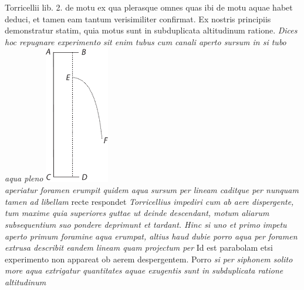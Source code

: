 Torricellii\protect{} lib. 2. de motu  ex qua plerasque omnes quas ibi de motu aquae\protect{} habet deduci, et tamen eam tantum verisimiliter confirmat. Ex nostris principiis demonstratur statim, quia motus sunt in subduplicata altitudinum ratione\protect{}.
\textit{Dices hoc repugnare experimento sit enim tubus  cum canali  aperto sursum in  si tubo aqua pleno} 
\pend
\vspace{1em}
\pstart
\centering
\includegraphics[trim = 0mm 0mm 0mm 0mm, clip, width=0.21\textwidth]{images/LH035,14,02_150v-d1.pdf}\\
\noindent {}
\pend
\count{}
\count{}
\newpage
\pstart \noindent \textit{aperiatur foramen  erumpit quidem aqua sursum per lineam  caditque per  nunquam tamen ad libellam 
} recte respondet \textit{Torricellius\protect{} impediri cum ab aere dispergente, tum maxime quia superiores guttae ut deinde descendant, motum aliarum subsequentium suo pondere deprimunt et tardant. Hinc si uno et primo impetu aperto primum foramine }\textit{}\textit{ aqua erumpat, altius haud dubie  porro aqua per foramen extrusa describit eandem lineam quam projectum per } Id est parabolam etsi experimento non appareat ob aerem despergentem. Porro \textit{si per siphonem solito more aqua extrigatur quantitates aquae exugentis sunt in subduplicata ratione altitudinum }
